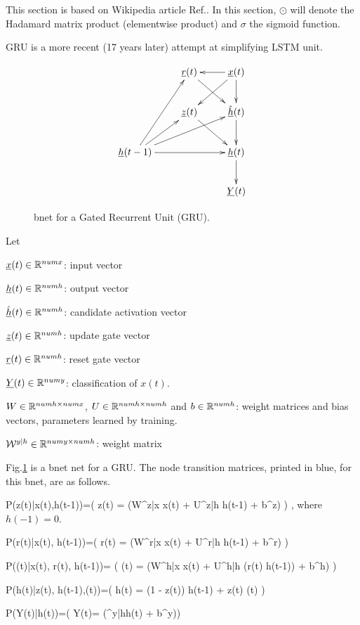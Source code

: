 This 
section is based 
on Wikipedia article Ref.\cite{gru}. In this section,
$\odot$
will denote the Hadamard matrix product
(elementwise product)  
and $\sigma$ the sigmoid function.

GRU is a more recent (17 years later)
attempt at simplifying LSTM unit.

\begin{figure}[h!]
\centering
$$\xymatrix{
&\rvr(t)\ar[dr]&\rvx(t)\ar[d]\ar[dl]\ar[l]
\\
&\rvz(t)\ar[dr]
&\hat{\rvh}(t)\ar[d]
\\
\rvh(t-1)\ar[ur]\ar[rr]\ar[urr]\ar[uur]
&&\rvh(t)\ar[d]
\\
&&\rvY(t)
}$$
\caption{bnet for a Gated
Recurrent Unit (GRU).}
\label{fig-rnn-gru}
\end{figure}

Let

${\underline{x}}(t)\in { \mathbb{R}}^{numx}$: input vector

${\underline{h}}(t)\in{ \mathbb{R}}^{numh}$: output vector

$\hat{{\underline{h}}}(t)\in{ \mathbb{R}}^{numh}$: candidate activation vector

${\underline{z}}(t)\in{ \mathbb{R}}^{numh}$: update gate vector

${\underline{r}}(t)\in{ \mathbb{R}}^{numh}$: reset gate vector

${\underline{Y}}(t)\in { \mathbb{R}}^{numy}$: 
classification of $x(t)$.

$W\in { \mathbb{R}}^{numh\times numx}$, 
$U\in { \mathbb{R}}^{numh\times numh}$
and 
$b\in { \mathbb{R}}^{numh}$: 
weight matrices and bias vectors,
 parameters learned by training.

${\cal W}^{y|h}\in { \mathbb{R}}^{numy\times numh}$:
 weight matrix

Fig.\ref{fig-rnn-gru}
is a bnet net
for a GRU.
The node transition matrices, printed in blue,
for this bnet, are
as follows.


\beq\color{blue}
P(z(t)|x(t),h(t-1))=\indi(\;\;\;
z(t) = \sigma(W^{z|x} x(t) + U^{z|h} h(t-1) + b^z)
\;\;\;)
\;,
\eeq
where $h(-1)=0$.

\beq\color{blue}
P(r(t)|x(t), h(t-1))=\indi(\;\;\;
r(t) = \sigma(W^{r|x} x(t) + U^{r|h} h(t-1) + b^r)
\;\;\;)
\eeq

\beq\color{blue}
P((t)|x(t), r(t), h(t-1))=
\indi(\;\;\;
(t) = \tanh(W^{h|x} x(t) +
 U^{h|h} (r(t) \odot h(t-1)) + b^h)
\;\;\;)
\eeq

\beq\color{blue}
P(h(t)|z(t), h(t-1),(t))=\indi(\;\;\;
h(t) =  (1 - z(t)) \odot h(t-1) +
 z(t) \odot {}(t)
\;\;\;)
\eeq

\beq\color{blue}
P(Y(t)|h(t))=\indi(\;\;\;
Y(t)= \cala(\calw^{y|h}h(t) + b^y)\;\;\;)
\eeq